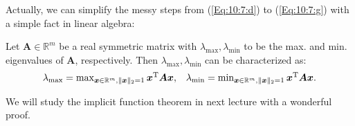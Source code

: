Actually, we can simplify the messy steps from (\ref{Eq:10:7:d}) to (\ref{Eq:10:7:g}) with a simple fact in linear algebra:
\begin{theorem}
Let $\bm A\in\mathbb{R}^m$ be a real symmetric matrix with $\lambda_{\max},\lambda_{\min}$ to be the max. and min. eigenvalues of $\bm A$, respectively. Then $\lambda_{\max},\lambda_{\min}$ can be characterized as:
\[
\begin{array}{ll}
\lambda_{\max}=\max_{\bm x\in\mathbb{R}^m,\|\bm x\|_2=1}\bm x^{\mathrm T}\bm A\bm x,
&
\lambda_{\min}=\min_{\bm x\in\mathbb{R}^m,\|\bm x\|_2=1}\bm x^{\mathrm T}\bm A\bm x.
\end{array}
\]
\end{theorem}
We will study the implicit function theorem in next lecture with a wonderful proof.
















